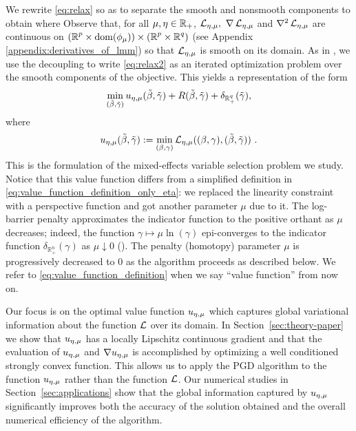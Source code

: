 We rewrite \eqref{eq:relax} %
so as to separate the smooth and nonsmooth components to obtain
where 
Observe that, for all $\mu,\eta\in\operatorname{\mathbb{R}}_+$, $\operatorname{\mathcal{L}}_{{\eta,\mu}},\ \nabla \operatorname{\mathcal{L}}_{{\eta,\mu}}$ and $\nabla^2 \operatorname{\mathcal{L}}_{{\eta,\mu}}$ are continuous
on $({\operatorname{\mathbb{R}}^p}\times\operatorname{\mathrm{dom}}(\phi_\mu))\times({\operatorname{\mathbb{R}}^p}\times{\operatorname{\mathbb{R}}^q})$ 
(see Appendix \ref{appendix:derivatives_of_lmm}) 
so that $\operatorname{\mathcal{L}}_{{\eta,\mu}}$ is smooth on its domain.
As in \cite{Zheng2019SR3}, we use the 
decoupling to write \eqref{eq:relax2}
as an iterated optimization problem over the smooth components of the objective.
This yields a representation of the form
\begin{equation}
    \label{eq:relax3}
    \min_{(\tilde\beta,{\tilde{\gamma}})} {u_{\eta,\mu}}(\tilde\beta,{\tilde{\gamma}}) + R(\tilde\beta,{\tilde{\gamma}})+\delta_{\operatorname{\mathbb{R}}^q_+}({\tilde{\gamma}}),
\end{equation}
where %
\begin{equation}
    \label{eq:value_function_definition}
    {u_{\eta,\mu}}(\tilde\beta,{\tilde{\gamma}}) := \min_{(\beta,\gamma) } 
    \operatorname{\mathcal{L}}_{{\eta,\mu}}((\beta,\gamma), (\tilde\beta,{\tilde{\gamma}}))\ .
\end{equation}
This is the formulation of the mixed-effects variable selection problem we study. 
Notice that this value function differs from a simplified 
definition in \eqref{eq:value_function_definition_only_eta}: we replaced 
the linearity constraint with a perspective function and got another parameter $\mu$ due to it. The log-barrier penalty approximates the indicator function to the positive orthant as $\mu$ decreases; indeed, the function $\gamma\mapsto\mu\ln(\gamma)$ epi-converges to the indicator function $\delta_{\mathbb{R}^n_+}(\gamma)$ as $\mu \downarrow 0$ (\cite{rockafellar2009variational}). The penalty (homotopy) parameter $\mu$ is progressively decreased to $0$ as the algorithm proceeds as described below. 
 We refer to \eqref{eq:value_function_definition} when we say ``value function'' from now on.

Our focus is on the optimal value function ${u_{\eta,\mu}}$ which captures global 
variational information about the function $\operatorname{\mathcal{L}}$ over its domain.
In Section~\ref{sec:theory-paper} we show that ${u_{\eta,\mu}}$ has a locally Lipschitz continuous gradient
and that the evaluation of ${u_{\eta,\mu}}$ and $\nabla {u_{\eta,\mu}}$ is accomplished
by optimizing a well conditioned strongly convex function. This
allows us to apply the PGD algorithm to the function ${u_{\eta,\mu}}$ rather than
the function $\operatorname{\mathcal{L}}$. Our numerical studies in Section~\ref{sec:applications} show that the global information 
captured by ${u_{\eta,\mu}}$ significantly improves both the accuracy of the solution
obtained and the overall numerical efficiency of the algorithm. 

